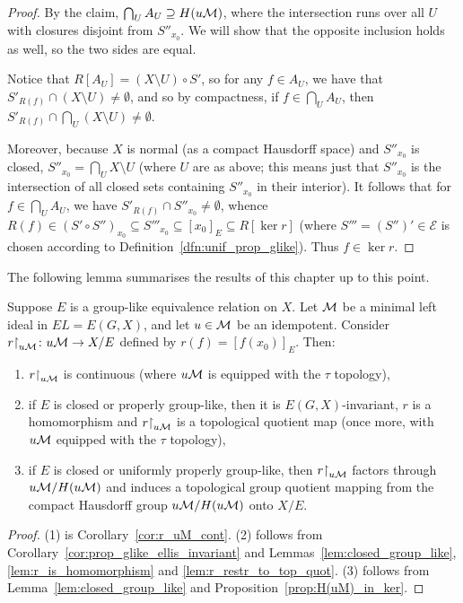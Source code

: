 \begin{proof}
		By the claim, $\bigcap_U A_U\supseteq H(u{\mathcal M})$, where the intersection runs over all $U$ with closures disjoint from $S''_{x_0}$. We will show that the opposite inclusion holds as well, so the two sides are equal.
		
		Notice that $R[A_U]=(X\setminus U)\circ S'$, so for any $f\in A_U$, we have that $S'_{R(f)}\cap (X\setminus U)\neq \emptyset$, and so by compactness, if $f\in \bigcap_U A_U$, then $S'_{R(f)}\cap \bigcap_U (X\setminus U)\neq \emptyset$.
		
		Moreover, because $X$ is normal (as a compact Hausdorff space) and $S''_{x_0}$ is closed, $S''_{x_0}=\bigcap_U X\setminus U$ (where $U$ are as above; this means just that $S''_{x_0}$ is the intersection of all closed sets containing $S''_{x_0}$ in their interior). It follows that for $f\in\bigcap_U A_U$, we have $S'_{R(f)}\cap S''_{x_0}\neq \emptyset$, whence $R(f)\in (S'\circ S'')_{x_0}\subseteq S'''_{x_0}\subseteq [x_0]_E\subseteq R[\ker r]$ (where $S'''=(S'')'\in \mathcal E$ is chosen according to Definition~\ref{dfn:unif_prop_glike}). Thus $f\in \ker r$.
	\end{proof}

	The following lemma summarises the results of this chapter up to this point.
	\begin{lem}
		\label{lem:main_abstract_grouplike}
		Suppose $E$ is a group-like equivalence relation on $X$. Let ${\mathcal M}$ be a minimal left ideal in $EL=E(G,X)$, and let $u\in {\mathcal M}$ be an idempotent.
		Consider $r\mathord{\upharpoonright}_{u{\mathcal M}}\colon u{\mathcal M}\to X/E$ defined by $r(f)=[f(x_0)]_E$.
		Then:
		\begin{enumerate}
			\item
			$r\mathord{\upharpoonright}_{u{\mathcal M}}$ is continuous (where $u{\mathcal M}$ is equipped with the $\tau$ topology),
			\item
			if $E$ is closed or properly group-like, then it is $E(G,X)$-invariant, $r$ is a homomorphism and $r\mathord{\upharpoonright}_{u{\mathcal M}}$ is a topological quotient map (once more, with $u{\mathcal M}$ equipped with the $\tau$ topology),
			\item
			if $E$ is closed or uniformly properly group-like, then  $r\mathord{\upharpoonright}_{u{\mathcal M}}$ factors through $u{\mathcal M}/H(u{\mathcal M})$ and induces a topological group quotient mapping from the compact Hausdorff group $u{\mathcal M}/H(u{\mathcal M})$ onto $X/E$.
			
		\end{enumerate}
	\end{lem}
	\begin{proof}
		(1) is Corollary~\ref{cor:r_uM_cont}. (2) follows from Corollary~\ref{cor:prop_glike_ellis_invariant} and Lemmas~\ref{lem:closed_group_like}, \ref{lem:r_is_homomorphism} and \ref{lem:r_restr_to_top_quot}. (3) follows from Lemma~\ref{lem:closed_group_like} and Proposition~\ref{prop:H(uM)_in_ker}.
	\end{proof}
	
